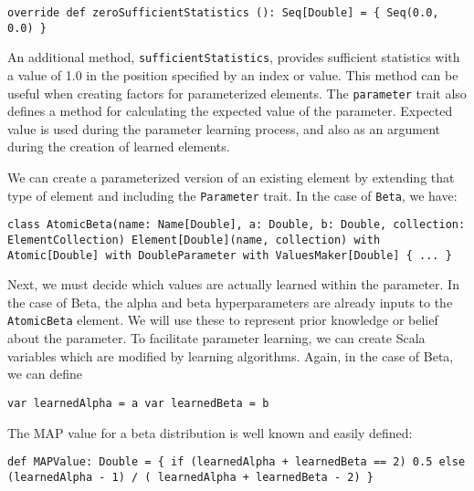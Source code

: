 \begin{flushleft}
\texttt{override def zeroSufficientStatistics (): Seq[Double] = \{ 
\newline \tab Seq(0.0, 0.0)
\newline \}
}
\end{flushleft}

An additional method,  \texttt{sufficientStatistics}, provides sufficient statistics with a value of 1.0 in the position specified by an index or value. This method can be useful when creating factors for parameterized elements. The \texttt{parameter} trait also defines a method for calculating the expected value of the parameter. Expected value is used during the parameter learning process, and also as an argument during the creation of learned elements.

We can create a parameterized version of an existing element by extending that type of element and including the \texttt{Parameter} trait. In the case of \texttt{Beta}, we have:

\begin{flushleft}
\texttt{class AtomicBeta(name: Name[Double], a: Double, b: Double, collection: ElementCollection) Element[Double](name, collection) with Atomic[Double] with
DoubleParameter with ValuesMaker[Double] \{ ... \}
}
\end{flushleft}

Next, we must decide which values are actually learned within the parameter. In the case of Beta, the alpha and beta hyperparameters are already inputs to the \texttt{AtomicBeta} element. We will use these to represent prior knowledge or belief about the parameter. To facilitate parameter learning, we can create Scala variables which are modified by learning algorithms. Again, in the case of Beta, we can define

\begin{flushleft}
\texttt{var learnedAlpha = a 
\newline var learnedBeta = b
}
\end{flushleft}

The MAP value for a beta distribution is well known and easily defined:

\begin{flushleft}
\texttt{def MAPValue: Double = \{
\newline \tab if (learnedAlpha + learnedBeta == 2) 0.5
\newline \tab else (learnedAlpha - 1) / ( learnedAlpha + learnedBeta - 2)
\newline \}
}
\end{flushleft}

